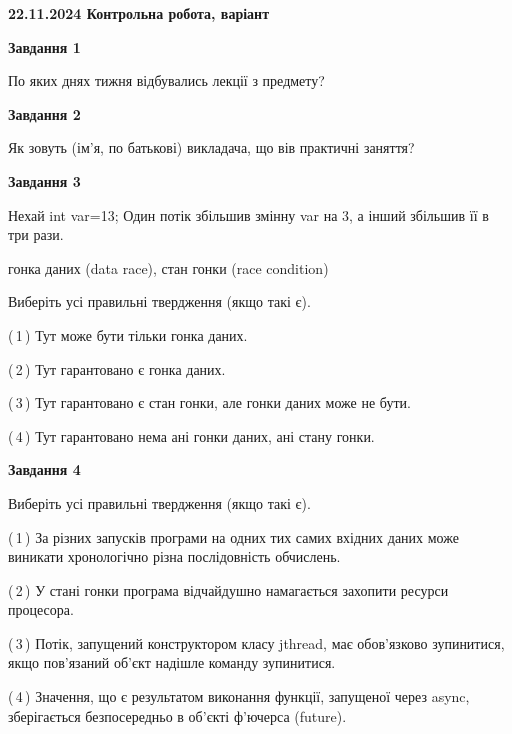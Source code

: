 \documentclass[12pt, ukrainian]{article}
\begin{document}
\begin {large}

\textbf{22.11.2024 Контрольна робота, варіант  }\par


{

\begin{center}
\textbf{Завдання 1}
\end{center}

По яких днях тижня відбувались лекції з предмету?


\begin{center}
\textbf{Завдання 2}
\end{center}

Як зовуть (ім'я, по батькові) викладача, що вів практичні заняття?


\begin{center}
\textbf{Завдання 3}
\end{center}

Нехай int var=13; Один потік збільшив змінну var на 3, а інший збільшив її в три рази.

гонка даних (data race), стан гонки (race condition)

Виберіть усі правильні твердження (якщо такі є).\par
\vspace{2mm}
(\,1\,) Тут може бути тільки гонка даних.%

(\,2\,) Тут гарантовано є гонка даних.%

(\,3\,) Тут гарантовано є стан гонки, але гонки даних може не бути.%

(\,4\,) Тут гарантовано нема ані гонки даних, ані стану гонки.%


\begin{center}
\textbf{Завдання 4}
\end{center}

Виберіть усі правильні твердження (якщо такі є).\par
\vspace{2mm}

(\,1\,) За різних запусків програми на одних тих самих вхідних даних може виникати хронологічно різна послідовність обчислень.%

(\,2\,) У стані гонки програма відчайдушно намагається захопити ресурси процесора.%

(\,3\,) Потік, запущений конструктором класу jthread, має обов’язково зупинитися, якщо пов’язаний об’єкт надішле команду зупинитися.%

(\,4\,) Значення, що є результатом виконання функції, запущеної через async, зберігається безпосередньо в об’єкті ф’ючерса (future).%


}
\end{large}
\end{document}
